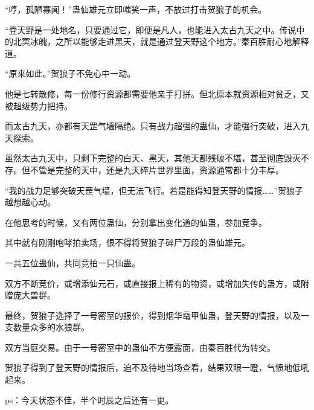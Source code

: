 \begin{this_body}
“哼，孤陋寡闻！”蛊仙雄元立即嗤笑一声，不放过打击贺狼子的机会。

“登天野是一处地名，只要通过它，即便是凡人，也能进入太古九天之中。传说中的北冥冰魄，之所以能够走进黑天，就是通过登天野这个地方。”秦百胜耐心地解释道。

“原来如此。”贺狼子不免心中一动。

他是七转散修，每一份修行资源都需要他亲手打拼。但北原本就资源相对贫乏，又被超级势力把持。

而太古九天，亦都有天罡气墙隔绝。只有战力超强的蛊仙，才能强行突破，进入九天探索。

虽然太古九天中，只剩下完整的白天、黑天，其他天都残破不堪，甚至彻底毁灭不存。但不管是完整的天中，还是九天碎片世界里面，资源通常都十分丰厚。

“我的战力足够突破天罡气墙，但无法飞行。若是能得知登天野的情报……”贺狼子越想越心动。

在他思考的时候，又有两位蛊仙，分别拿出变化道的仙蛊，参加竞争。

其中就有刚刚咆哮拍卖场，恨不得将贺狼子碎尸万段的蛊仙雄元。

一共五位蛊仙，共同竞拍一只仙蛊。

双方不断竞价，或增添仙元石，或直接报上稀有的物资，或增加失传的蛊方，或附赠庞大兽群。

最终，贺狼子选择了一号密室的报价，得到烟华鼋甲仙蛊，登天野的情报，以及一支数量众多的水狼群。

双方当庭交易。由于一号密室中的蛊仙不方便露面，由秦百胜代为转交。

贺狼子得到了登天野的情报后，迫不及待地当场查看，结果双眼一瞪，气愤地低吼起来。

ps：今天状态不佳，半个时辰之后还有一更。

\end{this_body}

